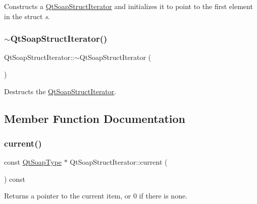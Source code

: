 Constructs a \mbox{\hyperlink{class_qt_soap_struct_iterator}{Qt\+Soap\+Struct\+Iterator}} and initializes it to point to the first element in the struct {\itshape s}. \mbox{\label{class_qt_soap_struct_iterator_a44a363fd50c46e5a1e6a21587c02340a}} 
\subsubsection{\texorpdfstring{$\sim$\+Qt\+Soap\+Struct\+Iterator()}{~QtSoapStructIterator()}}
{\footnotesize\ttfamily Qt\+Soap\+Struct\+Iterator\+::$\sim$\+Qt\+Soap\+Struct\+Iterator (\begin{DoxyParamCaption}{ }\end{DoxyParamCaption})}

Destructs the \mbox{\hyperlink{class_qt_soap_struct_iterator}{Qt\+Soap\+Struct\+Iterator}}. 

\subsection{Member Function Documentation}
\mbox{\label{class_qt_soap_struct_iterator_a4701e1dc8095c8615f05aae9295101ec}} 
\subsubsection{\texorpdfstring{current()}{current()}}
{\footnotesize\ttfamily const \mbox{\hyperlink{class_qt_soap_type}{Qt\+Soap\+Type}} $\ast$ Qt\+Soap\+Struct\+Iterator\+::current (\begin{DoxyParamCaption}{ }\end{DoxyParamCaption}) const}

Returns a pointer to the current item, or 0 if there is none. \mbox{\label{class_qt_soap_struct_iterator_a74bd8ec5fbf9f4eb5c38ded597ba07bf}} 
